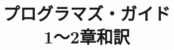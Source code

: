 \documentclass{OFbook}
\title{プログラマズ・ガイド\\ 1〜2章和訳}
\begin{document}
\maketitle
\frontmatter

\begin{OFdeclaration}
 
 
 
\end{OFdeclaration}

\tableofcontents

\mainmatter


% 

\end{document}

